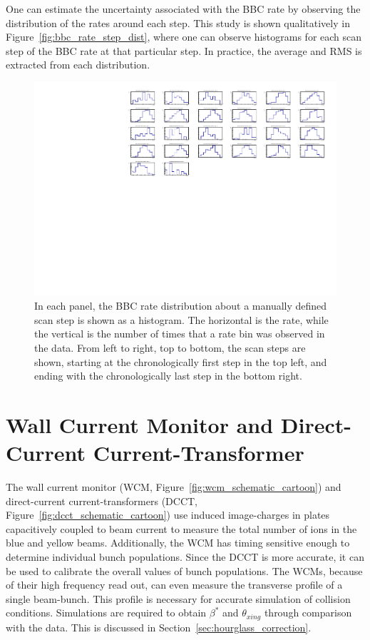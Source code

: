 One can estimate the uncertainty associated with the BBC rate by observing the
distribution of the rates around each step. This study is shown qualitatively in
Figure~\ref{fig:bbc_rate_step_dist}, where one can observe histograms for each
scan step of the BBC rate at that particular step. In practice, the average and
RMS is extracted from each distribution.

\begin{figure}
  \centering
  \includegraphics[width=\linewidth]{./figures/359711_bbc_rate_distribution_per_step.pdf}
  \caption{
    In each panel, the BBC rate distribution about a manually defined scan step
    is shown as a histogram. The horizontal is the rate, while the vertical is
    the number of times that a rate bin was observed in the data. From left to
    right, top to bottom, the scan steps are shown, starting at the
    chronologically first step in the top left, and ending with the
    chronologically last step in the bottom right.
  }

\end{figure}

\clearpage
\section{Wall Current Monitor and Direct-Current Current-Transformer}

The wall current monitor (WCM, Figure~\ref{fig:wcm_schematic_cartoon}) and
direct-current current-transformers (DCCT,
Figure~\ref{fig:dcct_schematic_cartoon}) use induced image-charges in plates
capacitively coupled to beam current to measure the total number of ions in the
blue and yellow beams. Additionally, the WCM has timing sensitive enough to
determine individual bunch populations. Since the DCCT is more accurate, it can
be used to calibrate the overall values of bunch populations. The WCMs, because
of their high frequency read out, can even measure the transverse profile of a
single beam-bunch. This profile is necessary for accurate simulation of
collision conditions. Simulations are required to obtain $\beta^*$ and
$\theta_{xing}$ through comparison with the data. This is discussed in
Section~\ref{sec:hourglass_correction}.

